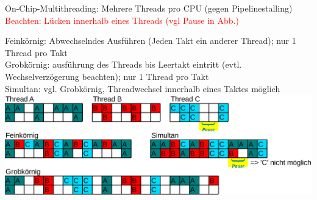 On-Chip-Multithreading: Mehrere Threads pro CPU (gegen Pipelinestalling)\\
\textcolor{red}{Beachten: Lücken innerhalb eines Threads (vgl Pause in Abb.)}

Feinkörnig: Abwechselndes Ausführen (Jeden Takt ein anderer Thread); nur 1 Thread pro Takt\\
Grobkörnig: ausführung des Threads bis Leertakt eintritt (evtl. Wechselverzögerung beachten); nur 1 Thread pro Takt\\
Simultan: vgl. Grobkörnig, Threadwechsel innerhalb eines Taktes möglich\\
\includegraphics[width=\textwidth]{Multithreading}


